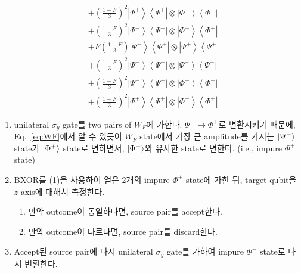 \documentclass[
]{kaohandt}
\begin{document}
{\begin{equation*}
\begin{aligned}
    & +\left(\frac{1-F}{3}\right)^2 \left|\Psi^{+}\right\rangle\left\langle\Psi^{+}\right| \otimes\left|\Phi^{-}\right\rangle\left\langle\Phi^{-}\right| \\ 
    & +\left(\frac{1-F}{3}\right)^2 \left|\Psi^{-}\right\rangle\left\langle\Psi^{-}\right| \otimes\left|\Phi^{+}\right\rangle\left\langle\Phi^{+}\right| \\ 
    & +F \left(\frac{1-F}{3}\right) \left|\Psi^{+}\right\rangle\left\langle\Psi^{+}\right| \otimes\left|\Psi^{+}\right\rangle\left\langle\Psi^{+}\right| \\ 
    & +\left(\frac{1-F}{3}\right)^2 \left|\Psi^{-}\right\rangle\left\langle\Psi^{-}\right| \otimes\left|\Psi^{-}\right\rangle\left\langle\Psi^{-}\right| \\ 
    & +\left(\frac{1-F}{3}\right)^2 \left|\Psi^{-}\right\rangle\left\langle\Psi^{-}\right| \otimes\left|\Phi^{-}\right\rangle\left\langle\Phi^{-}\right| \\ 
    & +\left(\frac{1-F}{3}\right)^2 \left|\Psi^{+}\right\rangle\left\langle\Psi^{+}\right| \otimes\left|\Phi^{+}\right\rangle\left\langle\Phi^{+}\right| 
\end{aligned}
\end{equation*}}

\begin{enumerate}
    \item unilateral $\sigma_y$ gate를 two pairs of $W_F$에 가한다. $\Psi^{-} \rightarrow \Phi^{+}$로 변환시키기 때문에, Eq.~\eqref{eq:WF}에서 알 수 있듯이 $W_F$ state에서 가장 큰 amplitude를 가지는 $\ket{\Psi^-}$ state가 $\ket{\Phi^+}$ state로 변하면서, $\ket{\Phi^+}$와 유사한 state로 변한다. (i.e., impure $\Phi^+$ state)
    \item BXOR를 (1)을 사용하여 얻은 2개의 impure $\Phi^+$ state에 가한 뒤, target qubit을 $z$ axis에 대해서 측정한다. 
    \begin{enumerate}
        \item 만약 outcome이 동일하다면, source pair를 accept한다.
        \item 만약 outcome이 다르다면, source pair를 discard한다.
    \end{enumerate}
    \item Accept된 source pair에 다시 unilateral $\sigma_y$ gate를 가하여 impure $\Phi^-$ state로 다시 변환한다. 
\end{enumerate}
\end{document}
